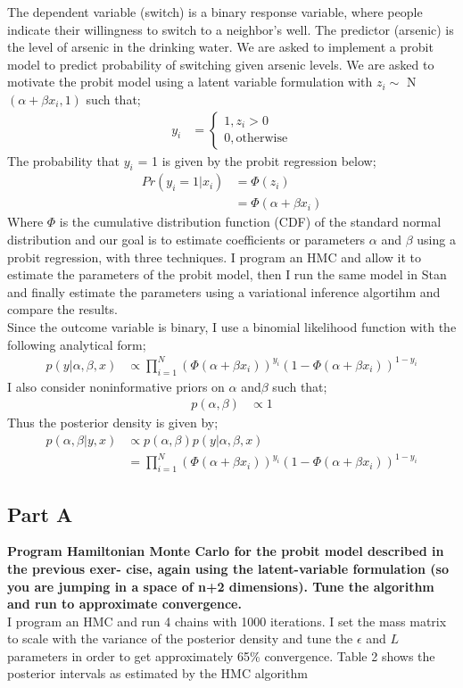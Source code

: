 \documentclass{article}
\begin{document}
The dependent variable (switch) is a binary response variable, where people indicate their willingness to switch to a neighbor's well. The predictor (arsenic) is the level of arsenic in the drinking water. We are asked to implement a probit model to predict probability of switching given arsenic levels. We are asked to motivate the probit model using a latent variable formulation with $z_i \sim$ N$(\alpha + \beta x_i, 1)$ such that;
\begin{align*}
y_i &= 
\begin{cases}
1 , z_i > 0\\
0, \text{otherwise}
\end{cases}
\end{align*}
The probability that $y_i$ = 1 is given by the probit regression below;
\begin{align*}
Pr(y_i = 1 | x_i) &= \Phi(z_i)\\
&= \Phi(\alpha + \beta x_i)
\end{align*}
Where $\Phi$ is the cumulative distribution function (CDF) of the standard normal distribution and our goal is to estimate coefficients or parameters $\alpha$ and $\beta$ using a probit regression, with three techniques. I program an HMC and allow it to estimate the parameters of the probit model, then I run the same model in Stan and finally estimate the parameters using a variational inference algortihm and compare the results.\\
Since the outcome variable is binary, I use a binomial likelihood function with the following analytical form;
\begin{align*}
p(y | \alpha, \beta , x) &\propto \prod_{i = 1}^{N}( \Phi(\alpha + \beta x_i))^{y_i} (1 - \Phi(\alpha + \beta x_i))^{1- y_i}
\end{align*}
I also consider noninformative priors on $\alpha$ and$\beta$ such that;
\begin{align*}
p(\alpha,\beta) &\propto 1
\end{align*}
Thus the posterior density is given by;
\begin{align*}
p( \alpha, \beta | y, x) &\propto p(\alpha, \beta)p(y | \alpha, \beta , x)\\
&=  \prod_{i = 1}^{N}( \Phi(\alpha + \beta x_i))^{y_i} (1 - \Phi(\alpha + \beta x_i))^{1- y_i}
\end{align*}

\subsection{Part A}
\textbf{Program Hamiltonian Monte Carlo for the probit model described in the previous exer- cise, again using the latent-variable formulation (so you are jumping in a space of n+2 dimensions). Tune the algorithm and run to approximate convergence.}\\
I program an HMC and run 4 chains with 1000 iterations. I set the mass matrix to scale with the variance of the posterior density and tune the $\epsilon$ and $L$ parameters in order to get approximately 65\% convergence. Table 2 shows the posterior intervals as estimated by the HMC algorithm
\end{document}
